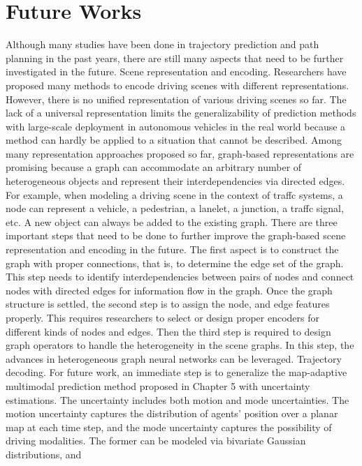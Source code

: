\section{Future Works}
\label{sec:6_future_works}

Although many studies have been done in trajectory prediction and path planning
in the past years, there are still many aspects that need to be further investigated
in the future.
Scene representation and encoding. Researchers have proposed many methods
to encode driving scenes with different representations. However, there is no unified
representation of various driving scenes so far. The lack of a universal representation limits the generalizability of prediction methods with large-scale deployment
in autonomous vehicles in the real world because a method can hardly be applied
to a situation that cannot be described. Among many representation approaches
proposed so far, graph-based representations are promising because a graph can
accommodate an arbitrary number of heterogeneous objects and represent their
interdependencies via directed edges. For example, when modeling a driving scene
in the context of traffc systems, a node can represent a vehicle, a pedestrian, a
lanelet, a junction, a traffc signal, etc. A new object can always be added to the
existing graph. There are three important steps that need to be done to further
improve the graph-based scene representation and encoding in the future. The first
aspect is to construct the graph with proper connections, that is, to determine the
edge set of the graph. This step needs to identify interdependencies between pairs
of nodes and connect nodes with directed edges for information flow in the graph.
Once the graph structure is settled, the second step is to assign the node, and edge
features properly. This requires researchers to select or design proper encoders
for different kinds of nodes and edges. Then the third step is required to design
graph operators to handle the heterogeneity in the scene graphs. In this step, the
advances in heterogeneous graph neural networks can be leveraged.
Trajectory decoding. For future work, an immediate step is to generalize the
map-adaptive multimodal prediction method proposed in Chapter 5 with uncertainty estimations. The uncertainty includes both motion and mode uncertainties.
The motion uncertainty captures the distribution of agents’ position over a planar
map at each time step, and the mode uncertainty captures the possibility of driving
modalities. The former can be modeled via bivariate Gaussian distributions, and
